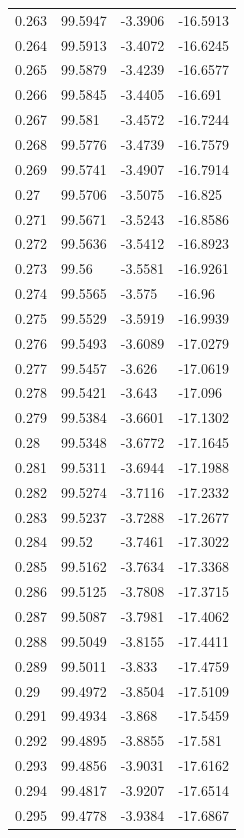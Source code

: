 \begin{tabular}{llll}
0.263 & 99.5947 & -3.3906 & -16.5913 \\
0.264 & 99.5913 & -3.4072 & -16.6245 \\
0.265 & 99.5879 & -3.4239 & -16.6577 \\
0.266 & 99.5845 & -3.4405 & -16.691 \\
0.267 & 99.581 & -3.4572 & -16.7244 \\
0.268 & 99.5776 & -3.4739 & -16.7579 \\
0.269 & 99.5741 & -3.4907 & -16.7914 \\
0.27 & 99.5706 & -3.5075 & -16.825 \\
0.271 & 99.5671 & -3.5243 & -16.8586 \\
0.272 & 99.5636 & -3.5412 & -16.8923 \\
0.273 & 99.56 & -3.5581 & -16.9261 \\
0.274 & 99.5565 & -3.575 & -16.96 \\
0.275 & 99.5529 & -3.5919 & -16.9939 \\
0.276 & 99.5493 & -3.6089 & -17.0279 \\
0.277 & 99.5457 & -3.626 & -17.0619 \\
0.278 & 99.5421 & -3.643 & -17.096 \\
0.279 & 99.5384 & -3.6601 & -17.1302 \\
0.28 & 99.5348 & -3.6772 & -17.1645 \\
0.281 & 99.5311 & -3.6944 & -17.1988 \\
0.282 & 99.5274 & -3.7116 & -17.2332 \\
0.283 & 99.5237 & -3.7288 & -17.2677 \\
0.284 & 99.52 & -3.7461 & -17.3022 \\
0.285 & 99.5162 & -3.7634 & -17.3368 \\
0.286 & 99.5125 & -3.7808 & -17.3715 \\
0.287 & 99.5087 & -3.7981 & -17.4062 \\
0.288 & 99.5049 & -3.8155 & -17.4411 \\
0.289 & 99.5011 & -3.833 & -17.4759 \\
0.29 & 99.4972 & -3.8504 & -17.5109 \\
0.291 & 99.4934 & -3.868 & -17.5459 \\
0.292 & 99.4895 & -3.8855 & -17.581 \\
0.293 & 99.4856 & -3.9031 & -17.6162 \\
0.294 & 99.4817 & -3.9207 & -17.6514 \\
0.295 & 99.4778 & -3.9384 & -17.6867 \\

\end{tabular}
